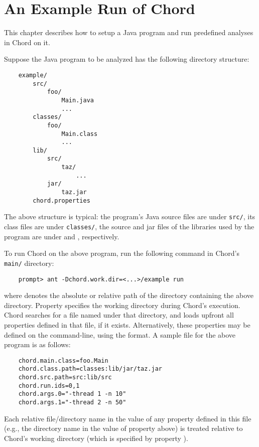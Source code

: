 \chapter{An Example Run of Chord}
\label{chap:example}

This chapter describes how to setup a Java program and run predefined analyses
in Chord on it.

Suppose the Java program to be analyzed has the following directory structure:

\begin{verbatim}
    example/
        src/
            foo/
                Main.java
                ...
        classes/
            foo/
                Main.class
                ...
        lib/
            src/
                taz/
                    ...
            jar/
                taz.jar
        chord.properties
\end{verbatim}

The above structure is typical: the program's Java source
files are under {\tt src/}, its class files are under {\tt classes/},
the source and jar files of the libraries used by the program are
under  and , respectively.

To run Chord on the above program, run the following command in
Chord's {\tt main/} directory:

\begin{verbatim}
    prompt> ant -Dchord.work.dir=<...>/example run
\end{verbatim}

where  denotes the absolute or relative path of the
directory containing the above  directory.
Property  specifies the working directory during Chord's execution.
Chord searches for a file named  under that directory, and
loads upfront all properties defined in that file, if it exists.  Alternatively, these properties
may be defined on the command-line, using the  format.
A sample  file for the above program is as follows:

\begin{verbatim}
    chord.main.class=foo.Main
    chord.class.path=classes:lib/jar/taz.jar
    chord.src.path=src:lib/src
    chord.run.ids=0,1
    chord.args.0="-thread 1 -n 10"
    chord.args.1="-thread 2 -n 50"
\end{verbatim}

Each relative file/directory name in the value of any property
defined in this file (e.g., the  directory name in the value of
property  above) is treated relative to Chord's working directory
(which is specified by property ).

